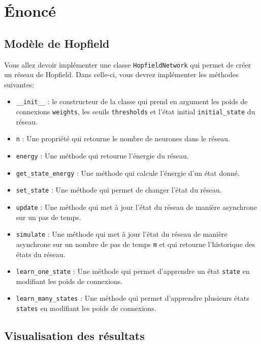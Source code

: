 \documentclass[12pt, letterpaper]{article}
\numberwithin{table}{section}
\numberwithin{figure}{section}
\numberwithin{equation}{section}
\begin{document}
\section{Énoncé}\label{sec:enonce}

\subsection{Modèle de Hopfield}\label{subsec:modele}

\noindent Vous allez devoir implémenter une classe \texttt{HopfieldNetwork} qui permet de créer un réseau de Hopfield.
Dans celle-ci, vous devrez implémenter les méthodes suivantes:
\begin{itemize}[label=\textbullet]
    \item \texttt{\_\_init\_\_} : le constructeur de la classe qui prend en argument les poids de connexions
    \texttt{weights}, les seuils \texttt{thresholds} et l'état initial \texttt{initial\_state} du réseau.
    \item \texttt{n} : Une propriété qui retourne le nombre de neurones dans le réseau.
    \item \texttt{energy} : Une méthode qui retourne l'énergie du réseau.
    \item \texttt{get\_state\_energy} : Une méthode qui calcule l'énergie d'un état donné.
    \item \texttt{set\_state} : Une méthode qui permet de changer l'état du réseau.
    \item \texttt{update} : Une méthode qui met à jour l'état du réseau de manière asynchrone sur un pas de temps.
    \item \texttt{simulate} : Une méthode qui met à jour l'état du réseau de manière asynchrone sur un nombre de
    pas de temps \texttt{m} et qui retourne l'historique des états du réseau.
    \item \texttt{learn\_one\_state} : Une méthode qui permet d'apprendre un état \texttt{state} en modifiant les
    poids de connexions.
    \item \texttt{learn\_many\_states} : Une méthode qui permet d'apprendre plusieurs états \texttt{states} en modifiant les
    poids de connexions.
\end{itemize}

\subsection{Visualisation des résultats}\label{subsec:visualisation-des-resultats}
\end{document}
